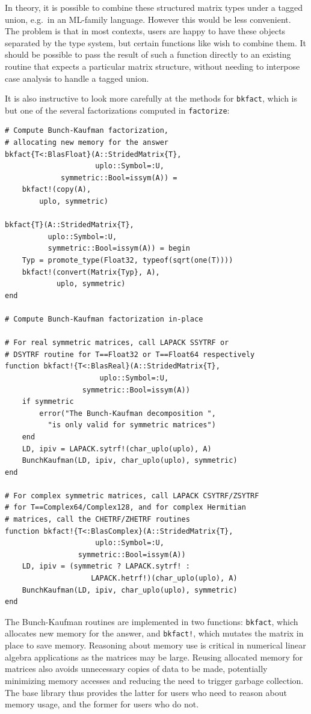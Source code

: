 \documentclass[10pt, preprint]{sigplanconf}
\begin{document}
In theory, it is possible to combine these structured matrix types under a
tagged union, e.g.\ in an ML-family language. However this would be
less convenient. The problem is that in most contexts,
users are happy to have these objects separated by the type system, but
certain functions like  wish to combine them. It should be
possible to pass the result of such a function directly to an existing
routine that expects a particular matrix structure, without needing to
interpose case analysis to handle a tagged union.

It is also instructive to look more carefully at the methods for \verb|bkfact|,
which is but one of the several factorizations computed in \verb|factorize|:

\begin{lstlisting}
# Compute Bunch-Kaufman factorization,
# allocating new memory for the answer
bkfact{T<:BlasFloat}(A::StridedMatrix{T},
                     uplo::Symbol=:U,
		     symmetric::Bool=issym(A)) =
    bkfact!(copy(A),
	    uplo, symmetric)

bkfact{T}(A::StridedMatrix{T},
          uplo::Symbol=:U,
          symmetric::Bool=issym(A)) = begin
    Typ = promote_type(Float32, typeof(sqrt(one(T))))
    bkfact!(convert(Matrix{Typ}, A),
            uplo, symmetric)
end

# Compute Bunch-Kaufman factorization in-place

# For real symmetric matrices, call LAPACK SSYTRF or
# DSYTRF routine for T==Float32 or T==Float64 respectively
function bkfact!{T<:BlasReal}(A::StridedMatrix{T},
		              uplo::Symbol=:U,
			      symmetric::Bool=issym(A)) 
    if symmetric
        error("The Bunch-Kaufman decomposition ",
	      "is only valid for symmetric matrices")
    end
    LD, ipiv = LAPACK.sytrf!(char_uplo(uplo), A)
    BunchKaufman(LD, ipiv, char_uplo(uplo), symmetric)
end

# For complex symmetric matrices, call LAPACK CSYTRF/ZSYTRF
# for T==Complex64/Complex128, and for complex Hermitian
# matrices, call the CHETRF/ZHETRF routines 
function bkfact!{T<:BlasComplex}(A::StridedMatrix{T},
	    			 uplo::Symbol=:U,
				 symmetric::Bool=issym(A))
    LD, ipiv = (symmetric ? LAPACK.sytrf! :
    			    LAPACK.hetrf!)(char_uplo(uplo), A)
    BunchKaufman(LD, ipiv, char_uplo(uplo), symmetric)
end
\end{lstlisting}

The Bunch-Kaufman routines are implemented in two functions: \verb|bkfact|,
which allocates new memory for the answer, and \verb|bkfact!|, which mutates
the matrix in place to save memory. Reasoning about memory use is critical in
numerical linear algebra applications as the matrices may be large.
Reusing allocated memory for matrices also avoids unnecessary copies of data to
be made, potentially minimizing memory accesses and reducing the need to
trigger garbage collection. The base library thus provides the latter for users
who need to reason about memory usage, and the former for users who do not.
\end{document}
